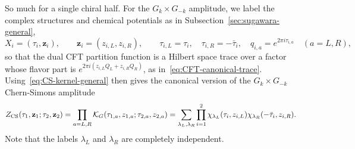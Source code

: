 \documentclass[11pt]{article}
\numberwithin{equation}{section}
\begin{document}
So much for a single chiral half. For the $G_k\times G_{-k}$ amplitude, we label the complex structures and chemical potentials as in Subsection~\ref{sec:sugawara-general},
\begin{equation}
    X_i=(\tau_i,\mathbf z_i),\qquad \mathbf z_i=(z_{i,L},z_{i,R}),\qquad
    \tau_{i,L}=\tau_i,\quad \tau_{i,R}=-\bar\tau_i,\quad
    q_{i,a}=e^{2\pi i\tau_{i,a}}\quad(a=L,R),
\end{equation}
so that the dual CFT partition function is a Hilbert space trace over a factor whose flavor part is $e^{2\pi i(z_{i,L}Q_L+z_{i,R}Q_R)}$, as in~\eqref{eq:CFT-canonical-trace}. Using~\eqref{eq:CS-kernel-general} then gives the canonical version of the $G_k\times G_{-k}$ Chern-Simons amplitude
\begin{equation}
\begin{aligned}
 Z_{\rm CS}(\tau_1,\mathbf z_1;\tau_2,\mathbf z_2)
 &=\prod_{a=L,R}\mathcal K_G(\tau_{1,a},z_{1,a};\tau_{2,a},z_{2,a})=\sum_{\lambda_L,\lambda_R}\prod_{i=1}^2
   \chi_{\lambda_L}(\tau_i,z_{i,L})
   \chi_{\lambda_R}(-\bar\tau_i,z_{i,R}).
\end{aligned}
\label{eq:CS-kernel-paired}
\end{equation}
Note that the labels $\lambda_L$ and $\lambda_R$ are completely independent. 
\end{document}
